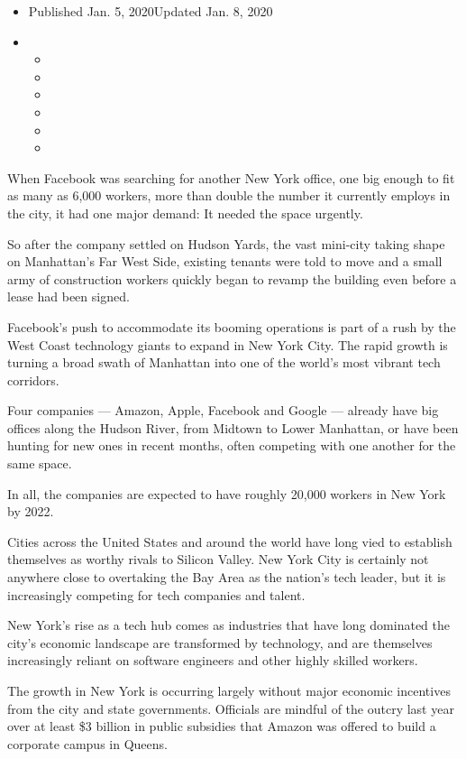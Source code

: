 \begin{itemize}
\item
  Published Jan. 5, 2020Updated Jan. 8, 2020
\item
  \begin{itemize}
  \item
  \item
  \item
  \item
  \item
  \item
  \end{itemize}
\end{itemize}

When Facebook was searching for another New York office, one big enough
to fit as many as 6,000 workers, more than double the number it
currently employs in the city, it had one major demand: It needed the
space urgently.

So after the company settled on Hudson Yards, the vast mini-city taking
shape on Manhattan's Far West Side, existing tenants were told to move
and a small army of construction workers quickly began to revamp the
building even before a lease had been signed.

Facebook's push to accommodate its booming operations is part of a rush
by the West Coast technology giants to expand in New York City. The
rapid growth is turning a broad swath of Manhattan into one of the
world's most vibrant tech corridors.

Four companies --- Amazon, Apple, Facebook and Google --- already have
big offices along the Hudson River, from Midtown to Lower Manhattan, or
have been hunting for new ones in recent months, often competing with
one another for the same space.

In all, the companies are expected to have roughly 20,000 workers in New
York by 2022.

Cities across the United States and around the world have long vied to
establish themselves as worthy rivals to Silicon Valley. New York City
is certainly not anywhere close to overtaking the Bay Area as the
nation's tech leader, but it is increasingly competing for tech
companies and talent.

New York's rise as a tech hub comes as industries that have long
dominated the city's economic landscape are transformed by technology,
and are themselves increasingly reliant on software engineers and other
highly skilled workers.

The growth in New York is occurring largely without major economic
incentives from the city and state governments. Officials are mindful of
the outcry last year over at least \$3 billion in public subsidies that
Amazon was offered to build a corporate campus in Queens.

